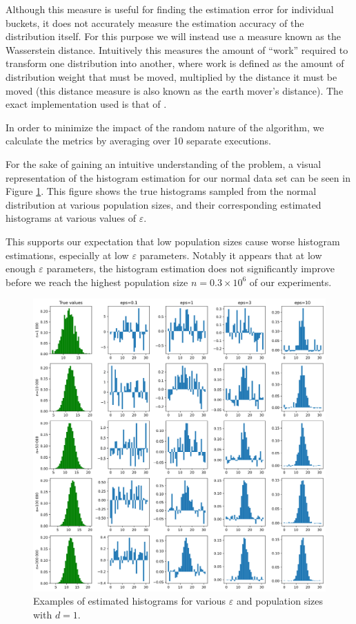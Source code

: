 \documentclass[a4paper,12pt]{article}
\renewcommand{\epsilon}{\varepsilon}
\begin{document}
Although this measure is useful for finding the estimation error for individual buckets, it does not accurately measure the estimation accuracy of the distribution itself. For this purpose we will instead use a measure known as the Wasserstein distance. Intuitively this measures the amount of ``work'' required to transform one distribution into another, where work is defined as the amount of distribution weight that must be moved, multiplied by the distance it must be moved (this distance measure is also known as the earth mover's distance). The exact implementation used is that of \cite{scipy_wasserstein}.

In order to minimize the impact of the random nature of the algorithm, we calculate the metrics by averaging over 10 separate executions.

For the sake of gaining an intuitive understanding of the problem, a visual representation of the histogram estimation for our normal data set can be seen in Figure \ref{fig:histogram_matrix}. This figure shows the true histograms sampled from the normal distribution at various population sizes, and their corresponding estimated histograms at various values of $\epsilon$. 

This supports our expectation that low population sizes cause worse histogram estimations, especially at low $\epsilon$ parameters. Notably it appears that at low enough $\epsilon$ parameters, the histogram estimation does not significantly improve before we reach the highest population size $n=0.3 \times 10^6$ of our experiments.

\begin{figure}
    \centering
    \includegraphics[width=\textwidth]{imgs/histogram_matrix.png}
    \caption{Examples of estimated histograms for various $\epsilon$ and population sizes with $d=1$.}
    \label{fig:histogram_matrix}
\end{figure}
\end{document}
